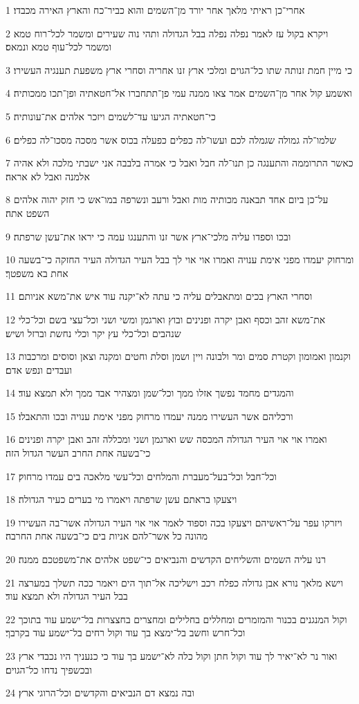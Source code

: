 \par 1 אחרי־כן ראיתי מלאך אחר יורד מן־השמים והוא כביר־כח והארץ האירה מכבדו׃
\par 2 ויקרא בקול עז לאמר נפלה נפלה בבל הגדולה ותהי נוה שעירים ומשמר לכל־רוח טמא ומשמר לכל־עוף טמא ונמאס׃
\par 3 כי מיין חמת זנותה שתו כל־הגוים ומלכי ארץ זנו אחריה וסחרי ארץ משפעת תענגיה העשירו׃
\par 4 ואשמע קול אחר מן־השמים אמר צאו ממנה עמי פן־תתחברו אל־חטאתיה ופן־תכו ממכותיה׃
\par 5 כי־חטאתיה הגיעו עד־לשמים ויזכר אלהים את־עונותיה׃
\par 6 שלמו־לה גמולה שגמלה לכם ועשו־לה כפלים כפעלה בכוס אשר מסכה מסכו־לה כפלים׃
\par 7 כאשר התרוממה והתענגה כן תנו־לה חבל ואבל כי אמרה בלבבה אני ישבתי מלכה ולא אהיה אלמנה ואבל לא אראה׃
\par 8 על־כן ביום אחד תבאנה מכותיה מות ואבל ורעב ונשרפה במו־אש כי חזק יהוה אלהים השפט אתה׃
\par 9 ובכו וספדו עליה מלכי־ארץ אשר זנו והתענגו עמה כי יראו את־עשן שרפתה׃
\par 10 ומרחוק יעמדו מפני אימת ענויה ואמרו אוי אוי לך בבל העיר הגדולה העיר החזקה כי־בשעה אחת בא משפטך׃
\par 11 וסחרי הארץ בכים ומתאבלים עליה כי עתה לא־יקנה עוד איש את־משא אניותם׃
\par 12 את־משא זהב וכסף ואבן יקרה ופנינים ובוץ וארגמן ומשי ושני וכל־עצי בשם וכל־כלי שנהבים וכל־כלי עץ יקר וכלי נחשת וברזל ושיש׃
\par 13 וקנמון ואמומון וקטרת סמים ומר ולבונה ויין ושמן וסלת וחטים ומקנה וצאן וסוסים ומרכבות ועבדים ונפש אדם׃
\par 14 והמגדים מחמד נפשך אזלו ממך וכל־שמן ומצהיר אבד ממך ולא תמצא עוד׃
\par 15 ורכליהם אשר העשירו ממנה יעמדו מרחוק מפני אימת ענויה ובכו והתאבלו׃
\par 16 ואמרו אוי אוי העיר הגדולה המכסה שש וארגמן ושני ומכללה זהב ואבן יקרה ופנינים כי־בשעה אחת החרב העשר הגדול הזה׃
\par 17 וכל־חבל וכל־בעל־מעברת והמלחים וכל־עשי מלאכה בים עמדו מרחוק׃
\par 18 ויצעקו בראתם עשן שרפתה ויאמרו מי בערים כעיר הגדולה׃
\par 19 ויזרקו עפר על־ראשיהם ויצעקו בכה וספוד לאמר אוי אוי העיר הגדולה אשר־בה העשירו מהונה כל אשר־להם אניות בים כי־בשעה אחת החרבה׃
\par 20 רנו עליה השמים והשליחים הקדשים והנביאים כי־שפט אלהים את־משפטכם ממנה׃
\par 21 וישא מלאך נורא אבן גדולה כפלח רכב וישליכה אל־תוך הים ויאמר ככה תשלך במערצה בבל העיר הגדולה ולא תמצא עוד׃
\par 22 וקול המנגנים בכנור והמזמרים ומחללים בחלילים ומחצרים בחצצרות בל־ישמע עוד בתוכך וכל־חרש וחשב בל־ימצא בך עוד וקול רחים בל־ישמע עוד בקרבך׃
\par 23 ואור נר לא־יאיר לך עוד וקול חתן וקול כלה לא־ישמע בך עוד כי כנעניך היו נכבדי ארץ ובכשפיך נדחו כל־הגוים׃
\par 24 ובה נמצא דם הנביאים והקדשים וכל־הרוגי ארץ׃

